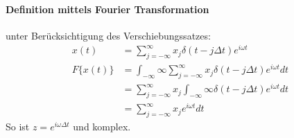 \paragraph{Definition mittels Fourier Transformation} unter Berücksichtigung des Verschiebungssatzes:
\[
\begin{split}
x(t) & =  \sum_{j=-\infty}^{\infty} x_j \delta (t-j \Delta t) e^{i \omega t}\\
F\{x(t)\} & = \int_{-\infty}{\infty}  \sum_{j=-\infty}^{\infty} x_j \delta (t-j \Delta t) e^{i \omega t} dt\\
& = \sum_{j=-\infty}^{\infty} x_j \int_{-\infty}{\infty} \delta (t-j \Delta t) e^{i \omega t} dt\\
& = \sum_{j=-\infty}^{\infty} x_j e^{i \omega t} dt
\end{split}
\]
So ist $z = e^{i \omega \Delta t}$ und komplex.